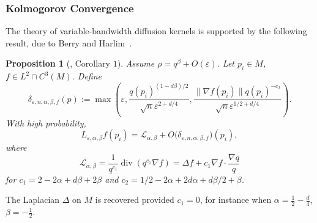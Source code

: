 \documentclass{article}
\newtheorem{proposition}[theorem]{Proposition}
\theoremstyle{remark}
\theoremstyle{plain}
\begin{document}







\subsubsection{Kolmogorov Convergence}


\label{subsubsec:kolmogorov-convergence}
The theory of variable-bandwidth diffusion kernels is supported by the following result, due to Berry and Harlim~\cite{Berry2016}. 
\begin{proposition}[\cite{Berry2016}, Corollary \( 1 \)]
\label{prop:BH-cor1}
Assume \( \rho=q^\beta  + O(\varepsilon)\). Let \( p_{i} \in M \), \( f \in L^2 \cap C^3(M) \). Define $$\delta_{\varepsilon, n, \alpha, \beta, f}(p):=\max \left(\varepsilon, \frac{q(p_{i})^{(1- d \beta) / 2}}{\sqrt{ n }\varepsilon^{2+d/4}}, \frac{\|\nabla f(p_{i})\| q(p_{i})^{-c_{2}}}{\sqrt{ n } \varepsilon^{1/2+d/4}}\right).$$
With high probability,
$$L_{\varepsilon, \alpha, \beta}f(p_{i})= \mathcal{L} _{\alpha, \beta}+ O\big(\delta_{\varepsilon, n, \alpha, \beta ,f}\big)(p_{i}) ,$$
where $$\mathcal{L}_{\alpha, \beta}= \frac{1}{q^{c_{1}}} \operatorname{div}(q^{c_{1}} \nabla f) = \Delta f +  c_{1} \nabla f \cdot \frac{\nabla q}{q}$$
for $c_{1}=2-2\alpha + d \beta + 2 \beta$ and $c_{2}=1 / 2 - 2\alpha + 2d \alpha + d \beta / 2 + \beta$. 

\end{proposition}

The Laplacian \( \Delta \) on \( M \) is recovered provided \( c_{1}=0 \), for instance when \( \alpha= \frac{1}{2} - \frac{d}{4} \), \( \beta=- \frac{1}{2} \). 
\end{document}
